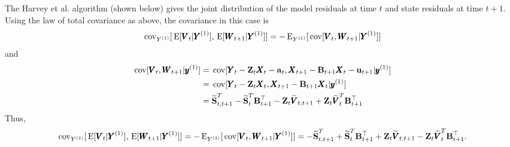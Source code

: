 \documentclass[]{article}
\def\UPS{\mbox{\boldmath $\Upsilon$}}
\def\XI{\mbox{\boldmath $\Xi$}}
\def\BB{\mbox{$\mathbf B$}}	\def\bb{\mbox{$\mathbf b$}} \def\Bb{\mbox{$\mathbf J$}} \def\Ba{\mbox{$\mathbf L$}} \def\Bm{\UPS}
\def\E{\,\textup{\textrm{E}}}
\def\Ss{\mbox{$\mathbf S$}}
\def\VV{\mbox{$\pmb{V}$}}	\def\vv{\mbox{$\pmb{v}$}}
\def\WW{\mbox{$\pmb{W}$}}	\def\ww{\mbox{$\pmb{w}$}}
\def\XX{\mbox{$\pmb{X}$}}	\def\xx{\mbox{$\pmb{x}$}}
\def\YY{\mbox{$\pmb{Y}$}}	\def\yy{\mbox{$\pmb{y}$}}
\def\ZZ{\mbox{$\mathbf Z$}}	\def\zz{\mbox{$\mathbf z$}}	\def\Zb{\mbox{$\mathbf M$}} \def\Za{\mbox{$\mathbf N$}} \def\Zm{\XI}
\def\cov{\,\textup{\textrm{cov}}}
\def\hatVt{\widetilde{\VV}_t^T}
\def\hatSt{\widetilde{\Ss}_t^T}
\def\hatSttp{\widetilde{\Ss}_{t,t+1}^T}
\begin{document}
The Harvey et al. algorithm (shown below) gives the joint distribution of the model residuals at time $t$ and state residuals at time $t+1$.  Using the law of total covariance as above, the covariance in this case is
\begin{equation}
\cov_{Y^{(1)}}[\E[\VV_t|\YY^{(1)}],\E[\WW_{t+1}|\YY^{(1)}]] = - \E_{Y^{(1)}}[ \cov[\VV_t, \WW_{t+1}|\YY^{(1)}] ] 
\end{equation}
and
\begin{equation}
\begin{split}
\cov[\VV_t, \WW_{t+1}|\yy^{(1)}] & =\cov[\YY_t-\ZZ_t\XX_t-\aa_t, \XX_{t+1}-\BB_{t+1}\XX_t-\uu_{t+1}|\yy^{(1)}] \\
& =\cov[\YY_t-\ZZ_t\XX_t, \XX_{t+1}-\BB_{t+1}\XX_t|\yy^{(1)}] \\
& = \hatSttp - \hatSt\BB_{t+1}^\top - \ZZ_t\widetilde{\VV}_{t,t+1} + \ZZ_t\hatVt\BB_{t+1}^\top
\end{split}
\end{equation}
Thus,
\begin{equation}
\cov_{Y^{(1)}}[\E[\VV_t|\YY^{(1)}],\E[\WW_{t+1}|\YY^{(1)}]] = - \E_{Y^{(1)}}[ \cov[\VV_t, \WW_{t+1}|\YY^{(1)}] ] = - \hatSttp + \hatSt\BB_{t+1}^\top + \ZZ_t\widetilde{\VV}_{t,t+1} - \ZZ_t\hatVt\BB_{t+1}^\top.
\end{equation}
\end{document}
